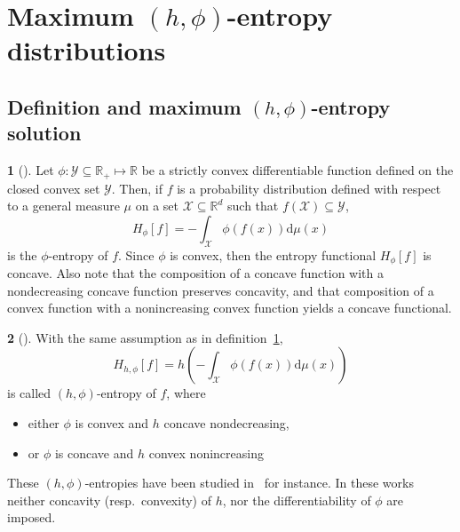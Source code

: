 \documentclass[english,sort&compress]{elsarticle}
\theoremstyle{definition}
\newtheorem{defn}{\protect\definitionname}
\theoremstyle{plain}
\theoremstyle{plain}
\providecommand{\definitionname}{Definition}
\def\dmu{\mathrm{d}\mu}
\def\Rset{\mathbb{R}}
\def\X{\mathcal{X}}
\def\Y{\mathcal{Y}}
\begin{document}

\section{Maximum $(h,\phi)$-entropy distributions}
\label{sec:MaxPhiEnt}



\subsection{Definition and maximum $(h,\phi)$-entropy solution}
\label{subsec:DefinitionPhiEnt}

\begin{defn}[\cite{Csi67, SalMen93, Sal94}]
\label{def:phi-entropy}
Let  $\phi:   \Y  \subseteq  \Rset_+   \mapsto  \Rset$  be  a   strictly  convex
differentiable function defined on the closed  convex set $\Y$.  Then, if $f$ is
a probability distribution defined with respect  to a general measure $\mu$ on a
set $\X \subseteq \Rset^d$ such that $f(\X) \subseteq \Y$,
  \begin{equation}\label{eq:phi-entropy}
    H_\phi[f] = - \int_\X \phi(f(x)) \dmu(x)
  \end{equation}
  is  the $\phi$-entropy  of  $f$.  Since  $\phi$  is convex,  then the  entropy
  functional  $H_\phi[f]$ is  concave.   Also  note that  the  composition of  a
  concave function  with a  nondecreasing concave function  preserves concavity,
  and that composition of a convex function with a nonincreasing convex function
  yields a concave functional.
\end{defn}

\begin{defn}[\cite{Csi67, SalMen93, Sal94}]
\label{def:h_phi-entropy}
  With the same assumption as in definition~\ref{def:phi-entropy},
  \begin{equation}\label{eq:h-phi-entropy}
    H_{h,\phi}[f] = h\left( - \int_\X \phi(f(x)) \dmu(x) \right)
  \end{equation}
  is called $(h,\phi)$-entropy of $f$, where
  \begin{itemize}
  \item either $\phi$ is convex and $h$ concave nondecreasing,
  \item or $\phi$ is concave and $h$ convex nonincreasing
  \end{itemize}
\end{defn}
%
These $(h,\phi)$-entropies have been studied in~\cite{SalMen93, Sal94, MenMor97}
for instance.  In  these works neither concavity (resp.\  convexity) of $h$, nor
the differentiability of $\phi$ are imposed.
\end{document}
